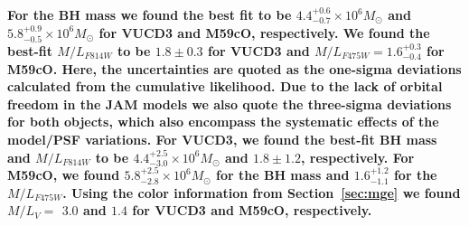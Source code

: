 \documentclass{aastex}
\begin{document}
\textbf{For the BH mass we found the best fit to be $4.4^{+0.6}_{-0.7} \times 10^6 M_{\odot}$ and $5.8^{+0.9}_{-0.5} \times 10^6 M_{\odot}$ for VUCD3 and M59cO, respectively. We found the best-fit $M/L_{F814W}$ to be $1.8 \pm 0.3$ for VUCD3 and $M/L_{F475W}=1.6^{+0.3}_{-0.4}$ for M59cO. Here, the uncertainties are quoted as the one-sigma deviations calculated from the cumulative likelihood. Due to the lack of orbital freedom in the JAM models we also quote the three-sigma deviations for both objects, which also encompass the systematic effects of the model/PSF variations. For VUCD3, we found the best-fit BH mass and $M/L_{F814W}$ to be $4.4^{+2.5}_{-3.0} \times 10^6 M_{\odot}$ and $1.8 \pm 1.2$, respectively. For M59cO, we found $5.8^{+2.5}_{-2.8} \times 10^6 M_{\odot}$ for the BH mass and $1.6^{+1.2}_{-1.1}$ for the $M/L_{F475W}$. Using the color information from Section~\ref{sec:mge} we found $M/L_V = $ $3.0$ and $1.4$ for VUCD3 and M59cO, respectively. }
 
\end{document}
